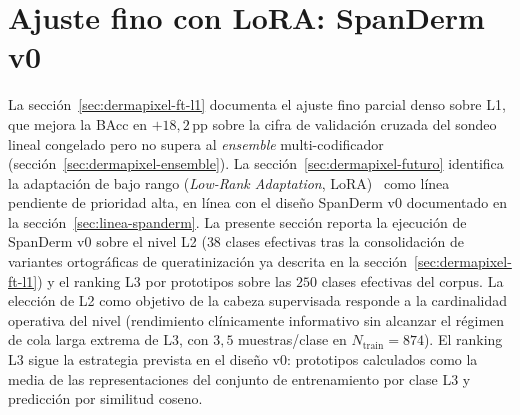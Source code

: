 \section{Ajuste fino con LoRA: SpanDerm v0}
\label{sec:dermapixel-spanderm-v0}

La secci\'on~\ref{sec:dermapixel-ft-l1} documenta el ajuste fino
parcial denso sobre L1, que mejora la BAcc en $+18{,}2$\,pp sobre
la cifra de validación cruzada del sondeo lineal congelado pero
no supera al \emph{ensemble} multi-codificador
(secci\'on~\ref{sec:dermapixel-ensemble}). La
secci\'on~\ref{sec:dermapixel-futuro} identifica la adaptación de
bajo rango (\emph{Low-Rank Adaptation}, LoRA)~\cite{lora} como
línea pendiente de prioridad alta, en línea con el diseño SpanDerm
v0 documentado en la secci\'on~\ref{sec:linea-spanderm}. La
presente sección reporta la ejecución de SpanDerm v0 sobre el
nivel L2 ($38$ clases efectivas tras la consolidación de
variantes ortográficas de queratinización ya descrita en la
secci\'on~\ref{sec:dermapixel-ft-l1}) y el ranking L3 por
prototipos sobre las $250$ clases efectivas del corpus. La
elección de L2 como objetivo de la cabeza supervisada responde a
la cardinalidad operativa del nivel (rendimiento clínicamente
informativo sin alcanzar el régimen de cola larga extrema de L3,
con $3{,}5$ muestras/clase en $N_{\mathrm{train}} = 874$). El
ranking L3 sigue la estrategia prevista en el diseño v0: prototipos
calculados como la media de las representaciones del conjunto de
entrenamiento por clase L3 y predicción por similitud coseno.

